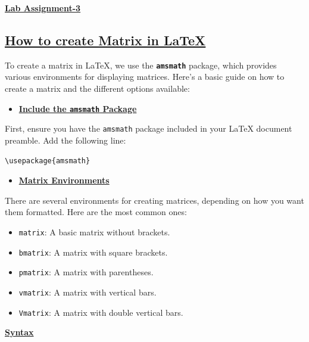 \documentclass{article}
\begin{document}
\newpage
{}

\begin{center}
    \LARGE{\textbf{\underline{Lab Assignment-3}}}
\end{center}
\vspace{0.2cm}
 \begin{center}
     \section*{\underline{How to create Matrix in LaTeX}}
\end{center}
\LARGE{To create a matrix in LaTeX, we use the \texttt{\textbf{amsmath}} package, which provides various environments for displaying matrices. Here’s a basic guide on how to create a matrix and the different options available:}
\vspace{0.1cm}
\begin{center}
\begin{itemize}
    \item{\underline{\textbf{Include the \texttt{amsmath} Package}}}
\end{itemize} 
\end{center}
First, ensure you have the \texttt{amsmath} package included in your LaTeX document preamble. Add the following line:
\begin{verbatim}
\usepackage{amsmath}
\end{verbatim}
\begin{center}
    \begin{itemize}
        \item {\textbf{\underline{Matrix Environments}}}
    \end{itemize}
\end{center}
\LARGE{
There are several environments for creating matrices, depending on how you want them formatted. Here are the most common ones:}

\begin{itemize}
  \item \texttt{matrix}: A basic matrix without brackets.
  \item \texttt{bmatrix}: A matrix with square brackets.
  \item \texttt{pmatrix}: A matrix with parentheses.
  \item \texttt{vmatrix}: A matrix with vertical bars.
  \item \texttt{Vmatrix}: A matrix with double vertical bars.
\end{itemize}
\begin{center}
        \item {\textbf{\underline{\LARGE{Syntax}}}}
\end{center}
\end{document}
